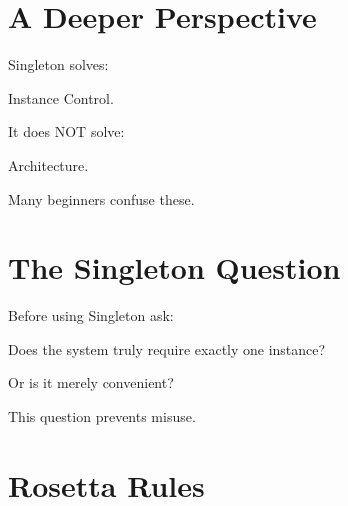 \documentclass[11pt,a4paper]{book}
\begin{document}

\section{A Deeper Perspective}

Singleton solves:


Instance Control.


It does NOT solve:


Architecture.


Many beginners confuse these.


\section{The Singleton Question}

Before using Singleton ask:


Does the system truly require
exactly one instance?


Or is it merely convenient?


This question prevents misuse.


\section{Rosetta Rules}
\end{document}
